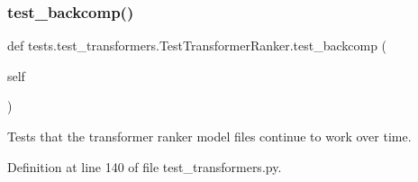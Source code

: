 \subsubsection{\texorpdfstring{test\+\_\+backcomp()}{test\_backcomp()}}
{\footnotesize\ttfamily def tests.\+test\+\_\+transformers.\+Test\+Transformer\+Ranker.\+test\+\_\+backcomp (\begin{DoxyParamCaption}\item[{}]{self }\end{DoxyParamCaption})}

\begin{DoxyVerb}Tests that the transformer ranker model files continue to work over time.
\end{DoxyVerb}
 

Definition at line 140 of file test\+\_\+transformers.\+py.


